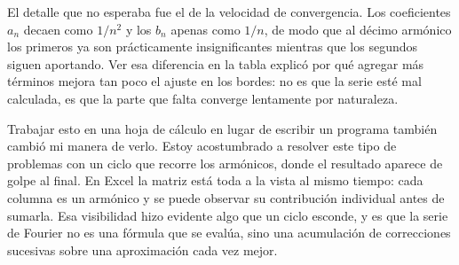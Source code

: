 El detalle que no esperaba fue el de la velocidad de convergencia. Los coeficientes $a_n$ decaen como $1/n^{2}$ y los $b_n$ apenas como $1/n$, de modo que al décimo armónico los primeros ya son prácticamente insignificantes mientras que los segundos siguen aportando. Ver esa diferencia en la tabla explicó por qué agregar más términos mejora tan poco el ajuste en los bordes: no es que la serie esté mal calculada, es que la parte que falta converge lentamente por naturaleza.

Trabajar esto en una hoja de cálculo en lugar de escribir un programa también cambió mi manera de verlo. Estoy acostumbrado a resolver este tipo de problemas con un ciclo que recorre los armónicos, donde el resultado aparece de golpe al final. En Excel la matriz está toda a la vista al mismo tiempo: cada columna es un armónico y se puede observar su contribución individual antes de sumarla. Esa visibilidad hizo evidente algo que un ciclo esconde, y es que la serie de Fourier no es una fórmula que se evalúa, sino una acumulación de correcciones sucesivas sobre una aproximación cada vez mejor.
